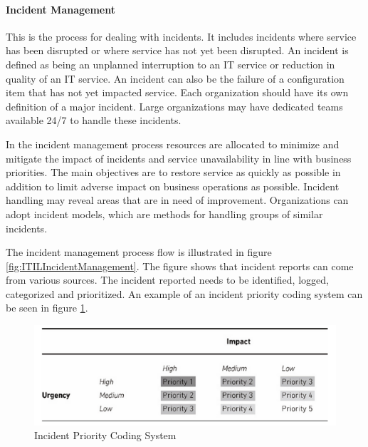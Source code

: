 \paragraph{Incident Management}
This is the process for dealing with incidents. It includes incidents where service has been disrupted or where service has not yet been disrupted. An incident is defined as being an unplanned interruption to an IT service or reduction in quality of an IT service. An incident can also be the failure of a configuration item that has not yet impacted service. Each organization should have its own definition of a major incident. Large organizations may have dedicated teams available 24/7 to handle these incidents. 

In the incident management process resources are allocated to minimize and mitigate the impact of incidents and service unavailability in line with business priorities. The main objectives are to restore service as quickly as possible in addition to limit adverse impact on business operations as possible. Incident handling may reveal areas that are in need of improvement. Organizations can adopt incident models, which are methods for handling groups of similar incidents.

The incident management process flow is illustrated in figure \ref{fig:ITILIncidentManagement}. The figure shows that incident reports can come from various sources. The incident reported needs to be identified, logged, categorized and prioritized. An example of an incident priority coding system can be seen in figure \ref{fig:ITILIncidentPrioritization}.


\begin{figure}[ht]
\begin{center}
\hspace{-0.2cm}\includegraphics[scale=0.4]{ITILIncidentPrioritization.png}
\caption[Incident Priority Coding System]{Incident Priority Coding System \cite{itilbok}}
\label{fig:ITILIncidentPrioritization}
\end{center}
\end{figure}

